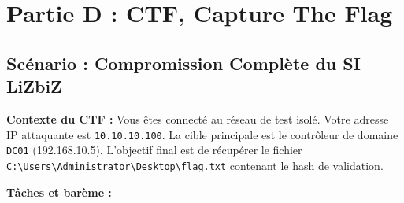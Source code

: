 \section{Partie D : CTF, Capture The Flag}
\label{sec:ctf}

\subsection{Scénario : Compromission Complète du SI LiZbiZ}
\label{subsec:ctf_scenario}

\begin{boxlizbiz}
\textbf{Contexte du CTF :}
Vous êtes connecté au réseau de test isolé. Votre adresse IP attaquante
est \texttt{10.10.10.100}. La cible principale est le contrôleur de
domaine \texttt{DC01} (192.168.10.5). L'objectif final est de récupérer
le fichier \texttt{C:\textbackslash{}Users\textbackslash{}Administrator\textbackslash{}Desktop\textbackslash{}flag.txt}
contenant le hash de validation.
\end{boxlizbiz}

\textbf{Tâches et barème :}

